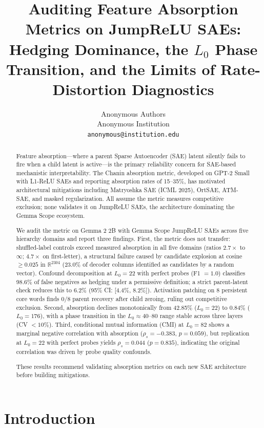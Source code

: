 \documentclass{article}
\title{Auditing Feature Absorption Metrics on JumpReLU SAEs: Hedging Dominance, the $L_0$ Phase Transition, and the Limits of Rate-Distortion Diagnostics}
\author{%
  Anonymous Authors \\
  Anonymous Institution \\
  \texttt{anonymous@institution.edu} \\
}
\begin{document}
\maketitle

\begin{abstract}
Feature absorption---where a parent Sparse Autoencoder (SAE) latent silently fails to fire when a child latent is active---is the primary reliability concern for SAE-based mechanistic interpretability. The Chanin absorption metric, developed on GPT-2 Small with L1-ReLU SAEs and reporting absorption rates of 15--35\%, has motivated architectural mitigations including Matryoshka SAE (ICML 2025), OrtSAE, ATM-SAE, and masked regularization. All assume the metric measures competitive exclusion; none validates it on JumpReLU SAEs, the architecture dominating the Gemma Scope ecosystem.

We audit the metric on Gemma 2 2B with Gemma Scope JumpReLU SAEs across five hierarchy domains and report three findings. First, the metric does not transfer: shuffled-label controls exceed measured absorption in all five domains (ratios $2.7\times$ to $\infty$; $4.7\times$ on first-letter), a structural failure caused by candidate explosion at cosine $\geq 0.025$ in $\mathbb{R}^{2304}$ (23.0\% of decoder columns identified as candidates by a random vector). Confound decomposition at $L_0 = 22$ with perfect probes (F1 $= 1.0$) classifies 98.6\% of false negatives as hedging under a permissive definition; a strict parent-latent check reduces this to 6.2\% (95\% CI: [4.4\%, 8.2\%]). Activation patching on 8 persistent core words finds 0/8 parent recovery after child zeroing, ruling out competitive exclusion. Second, absorption declines monotonically from 42.85\% ($L_0 = 22$) to 0.84\% ($L_0 = 176$), with a phase transition in the $L_0 \approx 40$--$80$ range stable across three layers (CV $< 10\%$). Third, conditional mutual information (CMI) at $L_0 = 82$ shows a marginal negative correlation with absorption ($\rho_s = -0.383$, $p = 0.059$), but replication at $L_0 = 22$ with perfect probes yields $\rho_s = 0.044$ ($p = 0.835$), indicating the original correlation was driven by probe quality confounds.

These results recommend validating absorption metrics on each new SAE architecture before building mitigations.
\end{abstract}


\section{Introduction}
\label{sec:intro}
\end{document}
